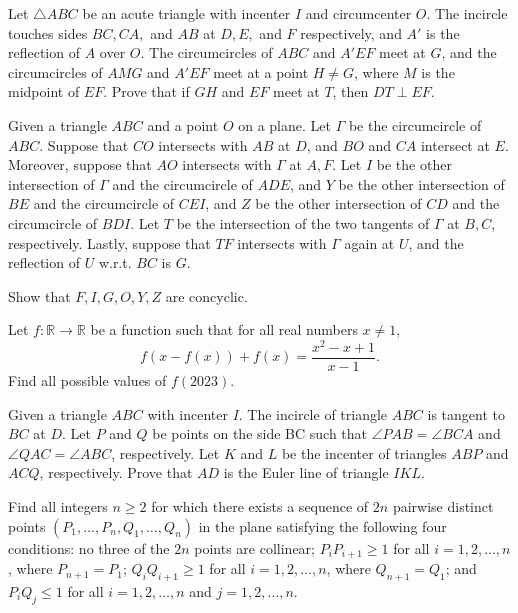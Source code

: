 \documentclass[11pt]{scrartcl}
\begin{document}
\begin{problem}[456772085666528]
Let $\triangle ABC$ be an acute triangle with incenter $I$ and circumcenter $O$. The incircle touches sides $BC,CA,$ and $AB$ at $D,E,$ and $F$ respectively, and $A'$ is the reflection of $A$ over $O$. The circumcircles of $ABC$ and $A'EF$ meet at $G$, and the circumcircles of $AMG$ and $A'EF$ meet at a point $H\neq G$, where $M$ is the midpoint of $EF$. Prove that if $GH$ and $EF$ meet at $T$, then $DT\perp EF$.
\end{problem}
\begin{problem}[2003233604438068678]
Given a triangle $ABC$ and a point $O$ on a plane. Let $\Gamma$ be the circumcircle of $ABC$. Suppose that $CO$ intersects with $AB$ at $D$, and $BO$ and $CA$ intersect at $E$. Moreover, suppose that $AO$ intersects with $\Gamma$ at $A,F$. Let $I$ be the other intersection of $\Gamma$ and the circumcircle of $ADE$, and $Y$ be the other intersection of $BE$ and the circumcircle of $CEI$, and $Z$ be the other intersection of $CD$ and the circumcircle of $BDI$. Let $T$ be the intersection of the two tangents of $\Gamma$ at $B,C$, respectively. Lastly, suppose that $TF$ intersects with $\Gamma$ again at $U$, and the reflection of $U$ w.r.t. $BC$ is $G$.

Show that $F,I,G,O,Y,Z$ are concyclic.
\end{problem}
\begin{problem}[249336393279214231]
Let \(f:\mathbb R\to\mathbb R\) be a function such that for all real numbers \(x\neq1\),\[f(x-f(x))+f(x)=\frac{x^2-x+1}{x-1}.\]Find all possible values of \(f(2023)\).
\end{problem}
\begin{problem}[579345048538257]
	Given a triangle $ABC$ with incenter $I$. The incircle of triangle $ABC$ is tangent to $BC$ at $D$. Let $P$ and $Q$ be points on the side BC such that $\angle PAB = \angle BCA$ and $\angle QAC = \angle ABC$, respectively. Let $K$ and $L$ be the incenter of triangles $ABP$ and $ACQ$, respectively. Prove that $AD$ is the Euler line of triangle $IKL$.
\end{problem}
\begin{problem}[817429246000759]
Find all integers $n \geq 2$ for which there exists a sequence of $2n$ pairwise distinct points $(P_1, \dots, P_n, Q_1, \dots, Q_n)$ in the plane satisfying the following four conditions:
no three of the $2n$ points are collinear;
$P_iP_{i+1} \ge 1$ for all $i = 1, 2, \dots ,n$, where $P_{n+1}=P_1$;
$Q_iQ_{i+1} \ge 1$ for all $i = 1, 2, \dots, n$, where $Q_{n+1} = Q_1$; and
$P_iQ_j \le 1$ for all $i = 1, 2, \dots, n$ and $j = 1, 2, \dots, n$.

\end{problem}
\end{document}

